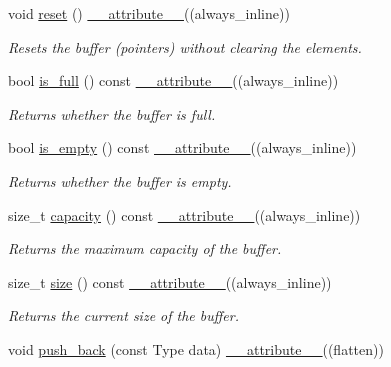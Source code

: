 \begin{DoxyCompactItemize}
\item 
void \hyperlink{classCircular__Buffer_a902eea867fd0c933af19b91f9b97ccee}{reset} () \hyperlink{utilities_8hpp_a103d5b3998e0dd804213c8f30a094f4d}{\+\_\+\+\_\+attribute\+\_\+\+\_\+}((always\+\_\+inline))
\begin{DoxyCompactList}\small\item\em Resets the buffer (pointers) without clearing the elements. \end{DoxyCompactList}\item 
bool \hyperlink{classCircular__Buffer_a5d5ae2d1423cb1e5fc8e4e05d356cdca}{is\+\_\+full} () const \hyperlink{utilities_8hpp_a103d5b3998e0dd804213c8f30a094f4d}{\+\_\+\+\_\+attribute\+\_\+\+\_\+}((always\+\_\+inline))
\begin{DoxyCompactList}\small\item\em Returns whether the buffer is full. \end{DoxyCompactList}\item 
bool \hyperlink{classCircular__Buffer_af2251f79c1509b7c1af0354ff7ac11fb}{is\+\_\+empty} () const \hyperlink{utilities_8hpp_a103d5b3998e0dd804213c8f30a094f4d}{\+\_\+\+\_\+attribute\+\_\+\+\_\+}((always\+\_\+inline))
\begin{DoxyCompactList}\small\item\em Returns whether the buffer is empty. \end{DoxyCompactList}\item 
size\+\_\+t \hyperlink{classCircular__Buffer_ad5ffdcccb9212547871ea6c1e399caca}{capacity} () const \hyperlink{utilities_8hpp_a103d5b3998e0dd804213c8f30a094f4d}{\+\_\+\+\_\+attribute\+\_\+\+\_\+}((always\+\_\+inline))
\begin{DoxyCompactList}\small\item\em Returns the maximum capacity of the buffer. \end{DoxyCompactList}\item 
size\+\_\+t \hyperlink{classCircular__Buffer_a94a93c974e51a8a7ac9cefdfe896aaac}{size} () const \hyperlink{utilities_8hpp_a103d5b3998e0dd804213c8f30a094f4d}{\+\_\+\+\_\+attribute\+\_\+\+\_\+}((always\+\_\+inline))
\begin{DoxyCompactList}\small\item\em Returns the current size of the buffer. \end{DoxyCompactList}\item 
void \hyperlink{classCircular__Buffer_a2271c0b158052ae6491972ce7237f888}{push\+\_\+back} (const Type data) \hyperlink{utilities_8hpp_a103d5b3998e0dd804213c8f30a094f4d}{\+\_\+\+\_\+attribute\+\_\+\+\_\+}((flatten))

\end{DoxyCompactItemize}
